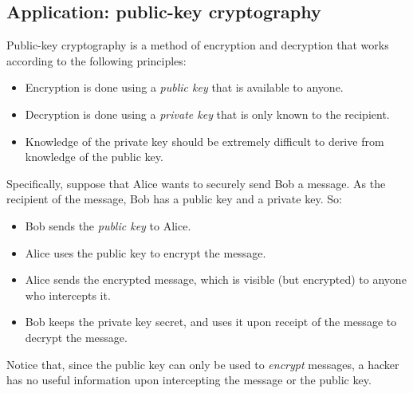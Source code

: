 \subsection*{Application: public-key cryptography}

Public-key cryptography is a method of encryption and decryption that works according to the following principles:
\begin{itemize}
\item Encryption is done using a \textit{public key} that is available to anyone.
\item Decryption is done using a \textit{private key} that is only known to the recipient.
\item Knowledge of the private key should be extremely difficult to derive from knowledge of the public key.
\end{itemize}

Specifically, suppose that Alice wants to securely send Bob a message. As the recipient of the message, Bob has a public key and a private key. So:
\begin{itemize}
\item Bob sends the \textit{public key} to Alice.
\item Alice uses the public key to encrypt the message.
\item Alice sends the encrypted message, which is visible (but encrypted) to anyone who intercepts it.
\item Bob keeps the private key secret, and uses it upon receipt of the message to decrypt the message.
\end{itemize}
Notice that, since the public key can only be used to \textit{encrypt} messages, a hacker has no useful information upon intercepting the message or the public key.

